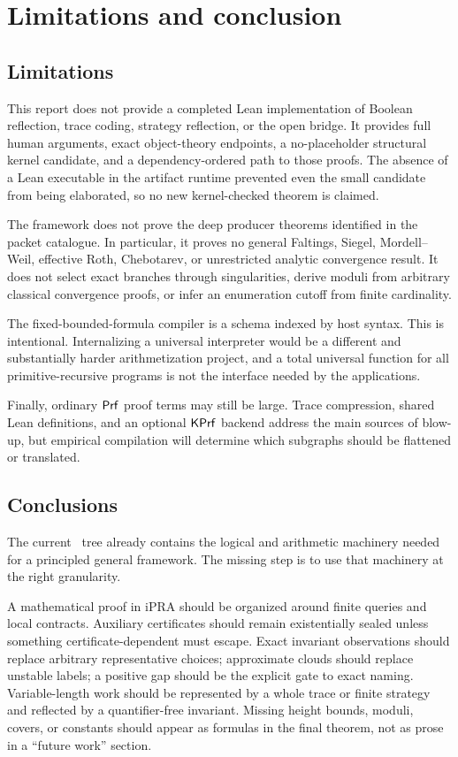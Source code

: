 \section{Limitations and conclusion}
\label{sec:limits}

\subsection{Limitations}

This report does not provide a completed Lean implementation of Boolean
reflection, trace coding, strategy reflection, or the open bridge.  It provides
full human arguments, exact object-theory endpoints, a no-placeholder
structural kernel candidate, and a dependency-ordered path to those proofs.
The absence of a Lean executable in the artifact runtime prevented even the
small candidate from being elaborated, so no new kernel-checked theorem is
claimed.

The framework does not prove the deep producer theorems identified in the
packet catalogue.  In particular, it proves no general Faltings, Siegel,
Mordell--Weil, effective Roth, Chebotarev, or unrestricted analytic convergence
result.  It does not select exact branches through singularities, derive
moduli from arbitrary classical convergence proofs, or infer an enumeration
cutoff from finite cardinality.

The fixed-bounded-formula compiler is a schema indexed by host syntax.  This is
intentional.  Internalizing a universal interpreter would be a different and
substantially harder arithmetization project, and a total universal function
for all primitive-recursive programs is not the interface needed by the
applications.

Finally, ordinary \(\mathsf{Prf}\) proof terms may still be large.  Trace compression,
shared Lean definitions, and an optional \(\mathsf{KPrf}\) backend address the main
sources of blow-up, but empirical compilation will determine which
subgraphs should be flattened or translated.

\subsection{Conclusions}

The current \repo\ tree already contains the logical and arithmetic machinery
needed for a principled general framework.  The missing step is to use that
machinery at the right granularity.

A mathematical proof in iPRA should be organized around finite queries and
local contracts.  Auxiliary certificates should remain existentially sealed
unless something certificate-dependent must escape.  Exact invariant
observations should replace arbitrary representative choices; approximate
clouds should replace unstable labels; a positive gap should be the explicit
gate to exact naming.  Variable-length work should be represented by a whole
trace or finite strategy and reflected by a quantifier-free invariant.  Missing
height bounds, moduli, covers, or constants should appear as formulas in the
final theorem, not as prose in a ``future work'' section.

